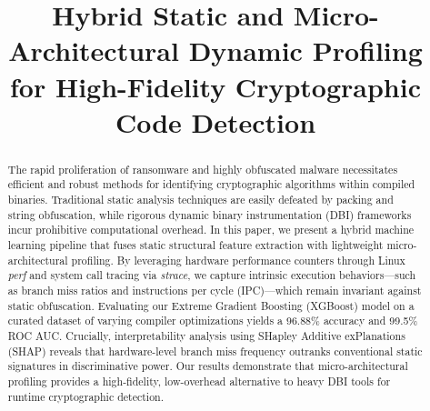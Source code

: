 \documentclass[conference]{IEEEtran}
\begin{document}
\title{Hybrid Static and Micro-Architectural Dynamic Profiling for High-Fidelity Cryptographic Code Detection}

\author{
\and
{}
\and
{}
\and
{}
}

\maketitle

\begin{abstract}
The rapid proliferation of ransomware and highly obfuscated malware necessitates efficient and robust methods for identifying cryptographic algorithms within compiled binaries. Traditional static analysis techniques are easily defeated by packing and string obfuscation, while rigorous dynamic binary instrumentation (DBI) frameworks incur prohibitive computational overhead. In this paper, we present a hybrid machine learning pipeline that fuses static structural feature extraction with lightweight micro-architectural profiling. By leveraging hardware performance counters through Linux \textit{perf} and system call tracing via \textit{strace}, we capture intrinsic execution behaviors---such as branch miss ratios and instructions per cycle (IPC)---which remain invariant against static obfuscation. Evaluating our Extreme Gradient Boosting (XGBoost) model on a curated dataset of varying compiler optimizations yields a 96.88\% accuracy and 99.5\% ROC AUC. Crucially, interpretability analysis using SHapley Additive exPlanations (SHAP) reveals that hardware-level branch miss frequency outranks conventional static signatures in discriminative power. Our results demonstrate that micro-architectural profiling provides a high-fidelity, low-overhead alternative to heavy DBI tools for runtime cryptographic detection.
\end{abstract}
\end{document}
